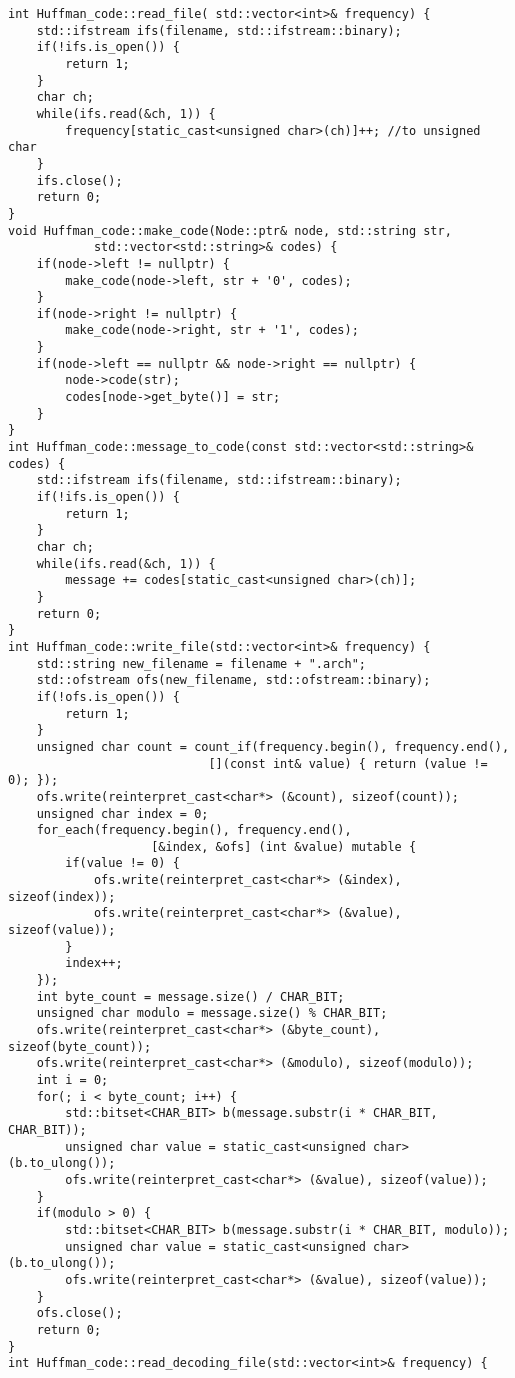 \begin{verbatim}
int Huffman_code::read_file( std::vector<int>& frequency) {
    std::ifstream ifs(filename, std::ifstream::binary);
    if(!ifs.is_open()) {
        return 1;
    }
    char ch;
    while(ifs.read(&ch, 1)) {
        frequency[static_cast<unsigned char>(ch)]++; //to unsigned char
    }
    ifs.close();
    return 0;
}
void Huffman_code::make_code(Node::ptr& node, std::string str, 
            std::vector<std::string>& codes) {
    if(node->left != nullptr) {
        make_code(node->left, str + '0', codes);
    }
    if(node->right != nullptr) {
        make_code(node->right, str + '1', codes);
    }
    if(node->left == nullptr && node->right == nullptr) {
        node->code(str);
        codes[node->get_byte()] = str;
    }
}
int Huffman_code::message_to_code(const std::vector<std::string>& codes) {
    std::ifstream ifs(filename, std::ifstream::binary);
    if(!ifs.is_open()) {
        return 1;
    }
    char ch;
    while(ifs.read(&ch, 1)) {
        message += codes[static_cast<unsigned char>(ch)];
    }
    return 0;
}
int Huffman_code::write_file(std::vector<int>& frequency) {
    std::string new_filename = filename + ".arch";
    std::ofstream ofs(new_filename, std::ofstream::binary);
    if(!ofs.is_open()) {
        return 1;
    }
    unsigned char count = count_if(frequency.begin(), frequency.end(),
                            [](const int& value) { return (value != 0); });
    ofs.write(reinterpret_cast<char*> (&count), sizeof(count));
    unsigned char index = 0;
    for_each(frequency.begin(), frequency.end(), 
                    [&index, &ofs] (int &value) mutable {
        if(value != 0) {
            ofs.write(reinterpret_cast<char*> (&index), sizeof(index));
            ofs.write(reinterpret_cast<char*> (&value), sizeof(value));
        }
        index++;
    });
    int byte_count = message.size() / CHAR_BIT;
    unsigned char modulo = message.size() % CHAR_BIT;
    ofs.write(reinterpret_cast<char*> (&byte_count), sizeof(byte_count));
    ofs.write(reinterpret_cast<char*> (&modulo), sizeof(modulo));
    int i = 0;
    for(; i < byte_count; i++) {
        std::bitset<CHAR_BIT> b(message.substr(i * CHAR_BIT, CHAR_BIT));
        unsigned char value = static_cast<unsigned char>(b.to_ulong());
        ofs.write(reinterpret_cast<char*> (&value), sizeof(value));
    }
    if(modulo > 0) {
        std::bitset<CHAR_BIT> b(message.substr(i * CHAR_BIT, modulo));
        unsigned char value = static_cast<unsigned char>(b.to_ulong());
        ofs.write(reinterpret_cast<char*> (&value), sizeof(value));
    }
    ofs.close();
    return 0;
}
int Huffman_code::read_decoding_file(std::vector<int>& frequency) {

\end{verbatim}
